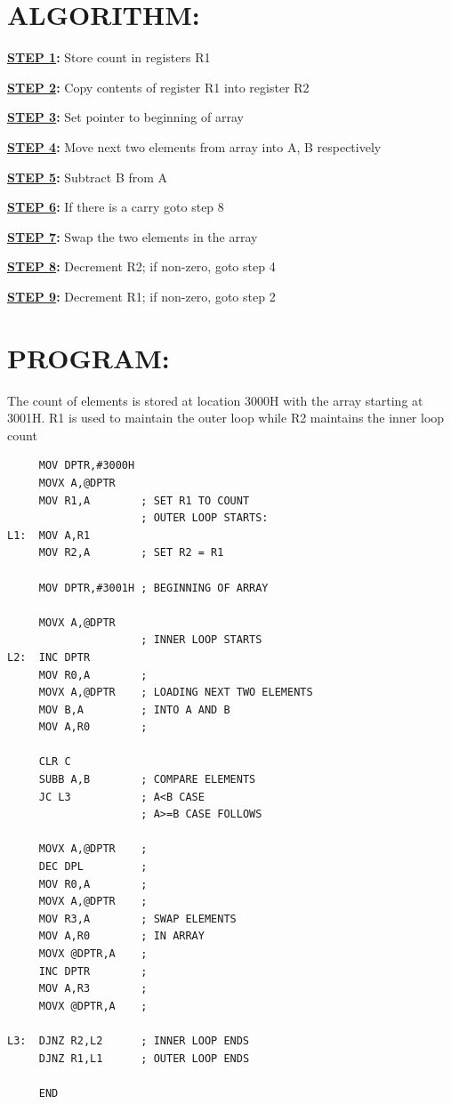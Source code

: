 \documentclass[a4paper,28pt,twoside,openright]{report}
\begin{document}
\section*{ALGORITHM:}
\textbf{\underline{STEP 1}:} Store count in registers R1

\textbf{\underline{STEP 2}:} Copy contents of register R1 into register R2

\textbf{\underline{STEP 3}:} Set pointer to beginning of array 

\textbf{\underline{STEP 4}:} Move next two elements from array into A, B respectively

\textbf{\underline{STEP 5}:} Subtract B from A

\textbf{\underline{STEP 6}:} If there is a carry goto step 8

\textbf{\underline{STEP 7}:} Swap the two elements in the array

\textbf{\underline{STEP 8}:} Decrement R2; if non-zero, goto step 4

\textbf{\underline{STEP 9}:} Decrement R1; if non-zero, goto step 2  
\section*{PROGRAM:}
The count of elements is stored at location 3000H with the array starting at 3001H. R1 is used to maintain the outer loop while R2 maintains the inner loop count
\begin{lstlisting}
     MOV DPTR,#3000H
     MOVX A,@DPTR
     MOV R1,A        ; SET R1 TO COUNT
                     ; OUTER LOOP STARTS:
L1:  MOV A,R1
     MOV R2,A        ; SET R2 = R1
     
     MOV DPTR,#3001H ; BEGINNING OF ARRAY
     
     MOVX A,@DPTR
                     ; INNER LOOP STARTS
L2:  INC DPTR 
     MOV R0,A        ;
     MOVX A,@DPTR    ; LOADING NEXT TWO ELEMENTS
     MOV B,A         ; INTO A AND B 
     MOV A,R0        ;
     
     CLR C
     SUBB A,B        ; COMPARE ELEMENTS
     JC L3           ; A<B CASE
                     ; A>=B CASE FOLLOWS
            
     MOVX A,@DPTR    ;
     DEC DPL         ;
     MOV R0,A        ;
     MOVX A,@DPTR    ; 
     MOV R3,A        ; SWAP ELEMENTS
     MOV A,R0        ; IN ARRAY
     MOVX @DPTR,A    ;
     INC DPTR        ;
     MOV A,R3        ;
     MOVX @DPTR,A    ;
     
L3:  DJNZ R2,L2      ; INNER LOOP ENDS
     DJNZ R1,L1      ; OUTER LOOP ENDS
     
     END
\end{lstlisting}
\end{document}
